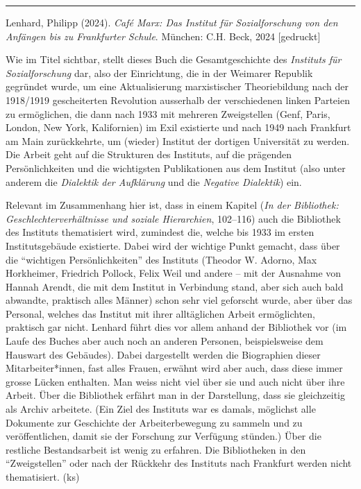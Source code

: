 \documentclass[a4paper,
fontsize=11pt,
oneside,
numbers=noperiodatend,
parskip=half-,
bibliography=totoc,
final
]{scrartcl}
\begin{document}
\begin{center}\rule{0.5\linewidth}{0.5pt}\end{center}

Lenhard, Philipp (2024). \emph{Café Marx: Das Institut für
Sozialforschung von den Anfängen bis zu Frankfurter Schule}. München:
C.H. Beck, 2024 {[}gedruckt{]}

Wie im Titel sichtbar, stellt dieses Buch die Gesamtgeschichte des
\emph{Instituts für Sozialforschung} dar, also der Einrichtung, die in
der Weimarer Republik gegründet wurde, um eine Aktualisierung
marxistischer Theoriebildung nach der 1918/1919 gescheiterten Revolution
ausserhalb der verschiedenen linken Parteien zu ermöglichen, die dann
nach 1933 mit mehreren Zweigstellen (Genf, Paris, London, New York,
Kalifornien) im Exil existierte und nach 1949 nach Frankfurt am Main
zurückkehrte, um (wieder) Institut der dortigen Universität zu werden.
Die Arbeit geht auf die Strukturen des Instituts, auf die prägenden
Persönlichkeiten und die wichtigsten Publikationen aus dem Institut
(also unter anderem die \emph{Dialektik der Aufklärung} und die
\emph{Negative Dialektik}) ein.

Relevant im Zusammenhang hier ist, dass in einem Kapitel (\emph{In der
Bibliothek: Geschlechterverhältnisse und soziale Hierarchien}, 102--116)
auch die Bibliothek des Instituts thematisiert wird, zumindest die,
welche bis 1933 im ersten Institutsgebäude existierte. Dabei wird der
wichtige Punkt gemacht, dass über die \enquote{wichtigen
Persönlichkeiten} des Instituts (Theodor W. Adorno, Max Horkheimer,
Friedrich Pollock, Felix Weil und andere – mit der Ausnahme von Hannah
Arendt, die mit dem Institut in Verbindung stand, aber sich auch bald
abwandte, praktisch alles Männer) schon sehr viel geforscht wurde, aber
über das Personal, welches das Institut mit ihrer alltäglichen Arbeit
ermöglichten, praktisch gar nicht. Lenhard führt dies vor allem anhand
der Bibliothek vor (im Laufe des Buches aber auch noch an anderen
Personen, beispielsweise dem Hauswart des Gebäudes). Dabei dargestellt
werden die Biographien dieser Mitarbeiter*innen, fast alles Frauen,
erwähnt wird aber auch, dass diese immer grosse Lücken enthalten. Man
weiss nicht viel über sie und auch nicht über ihre Arbeit. Über die
Bibliothek erfährt man in der Darstellung, dass sie gleichzeitig als
Archiv arbeitete. (Ein Ziel des Instituts war es damals, möglichst alle
Dokumente zur Geschichte der Arbeiterbewegung zu sammeln und zu
veröffentlichen, damit sie der Forschung zur Verfügung stünden.) Über
die restliche Bestandsarbeit ist wenig zu erfahren. Die Bibliotheken in
den \enquote{Zweigstellen} oder nach der Rückkehr des Instituts nach
Frankfurt werden nicht thematisiert. (ks)
\end{document}
